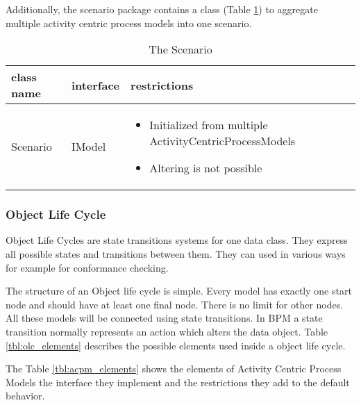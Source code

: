 Additionally, the scenario package contains a class (Table \ref{tbl:scenario}) to aggregate multiple activity centric process models into one scenario.


\begin{table}[h]
	\centering
	\begin{tabular}{|l|l|p{8cm}|}
		\hline
		\textbf{class name} & \textbf{interface} & \textbf{restrictions}\\
		\hline
		Scenario & IModel & \begin{itemize}
					\item Initialized from multiple ActivityCentricProcessModels
					\item Altering is not possible
				\end{itemize}\\
		\hline
	\end{tabular}
	\caption{The Scenario}
	\label{tbl:scenario}
\end{table}

\subsubsection{Object Life Cycle}

Object Life Cycles are state transitions systems for one data class.
They express all possible states and transitions between them.
They can used in various ways for example for conformance checking.

The structure of an Object life cycle is simple.
Every model has exactly one start node and should have at least one final node.
There is no limit for other nodes.
All these models will be connected using state transitions.
In BPM a state transition normally represents an action which alters the data object.
Table \ref{tbl:olc_elements} describes the possible elements used inside a object life cycle.

The Table \ref{tbl:acpm_elements} shows the elements of Activity Centric Process Models the interface they implement and the restrictions they add to the default behavior.

